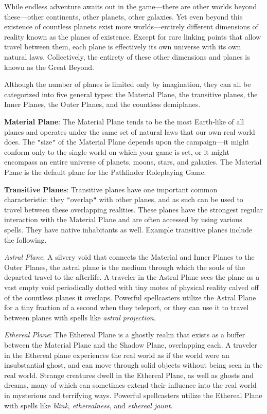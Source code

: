 				
While endless adventure awaits out in the game---there are other worlds beyond these---other continents, other planets, other galaxies. Yet even beyond this existence of countless planets exist more worlds---entirely different dimensions of reality known as the planes of existence. Except for rare linking points that allow travel between them, each plane is effectively its own universe with its own natural laws. Collectively, the entirety of these other dimensions and planes is known as the Great Beyond.
				
Although the number of planes is limited only by imagination, they can all be categorized into five general types: the Material Plane, the transitive planes, the Inner Planes, the Outer Planes, and the countless demiplanes.
				
\textbf{Material Plane}: The Material Plane tends to be the most Earth-like of all planes and operates under the same set of natural laws that our own real world does. The \texttt{{}"{}}size\texttt{{}"{}} of the Material Plane depends upon the campaign---it might conform only to the single world on which your game is set, or it might encompass an entire universe of planets, moons, stars, and galaxies. The Material Plane is the default plane for the Pathfinder Roleplaying Game.
				
\textbf{Transitive Planes}: Transitive planes have one important common characteristic: they \texttt{{}"{}}overlap\texttt{{}"{}} with other planes, and as such can be used to travel between these overlapping realities. These planes have the strongest regular interaction with the Material Plane and are often accessed by using various spells. They have native inhabitants as well. Example transitive planes include the following.
				
\textit{Astral Plane}: A silvery void that connects the Material and Inner Planes to the Outer Planes, the astral plane is the medium through which the souls of the departed travel to the afterlife. A traveler in the Astral Plane sees the plane as a vast empty void periodically dotted with tiny motes of physical reality calved off of the countless planes it overlaps. Powerful spellcasters utilize the Astral Plane for a tiny fraction of a second when they teleport, or they can use it to travel between planes with spells like \textit{astral projection}.
				
\textit{Ethereal Plane}: The Ethereal Plane is a ghostly realm that exists as a buffer between the Material Plane and the Shadow Plane, overlapping each. A traveler in the Ethereal plane experiences the real world as if the world were an insubstantial ghost, and can move through solid objects without being seen in the real world. Strange creatures dwell in the Ethereal Plane, as well as ghosts and dreams, many of which can sometimes extend their influence into the real world in mysterious and terrifying ways. Powerful spellcasters utilize the Ethereal Plane with spells like \textit{blink}, \textit{etherealness}, and \textit{ethereal jaunt}.
				
